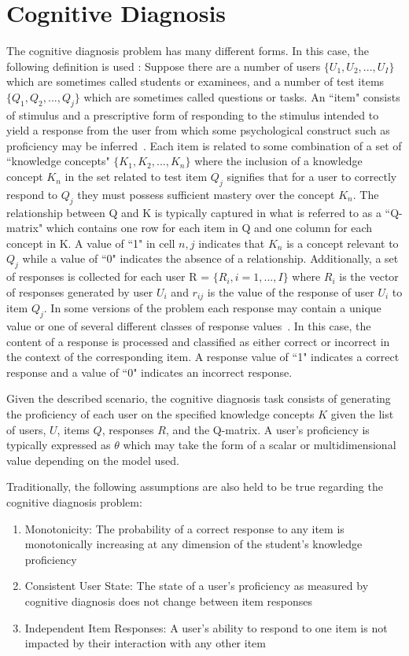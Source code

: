 \documentclass[letterpaper, 12pt, captions=tableabove]{scrreprt}
\begin{document}
	\section{Cognitive Diagnosis}
	\label{sec:cognitiveDiagnosis}
	
		The cognitive diagnosis problem has many different forms. In this case, the following definition is used \cite{wang2024}: Suppose there are a number of users $\{U_1, U_2, ..., U_I\}$ which are sometimes called students or examinees, and a number of test items $\{Q_1, Q_2, ..., Q_j\}$ which are sometimes called questions or tasks. An ``item" consists of stimulus and a prescriptive form of responding to the stimulus intended to yield a response from the user from which some psychological construct such as proficiency may be inferred~\cite{osterlind1990}. Each item is related to some combination of a set of ``knowledge concepts" $\{K_1, K_2, ..., K_n\}$ where the inclusion of a knowledge concept $K_n$ in the set related to test item $Q_j$ signifies that for a user to correctly respond to $Q_j$ they must possess sufficient mastery over the concept $K_n$. The relationship between Q and K is typically captured in what is referred to as a ``Q-matrix" which contains one row for each item in Q and one column for each concept in K. A value of ``1" in cell $n,j$ indicates that $K_n$ is a concept relevant to $Q_j$ while a value of ``0" indicates the absence of a relationship. Additionally, a set of responses is collected for each user R = $\{R_i, i = 1, ..., I\}$ where $R_i$ is the vector of responses generated by user $U_i$ and $r_{ij}$ is the value of the response of user $U_i$ to item $Q_j$. In some versions of the problem each response may contain a unique value or one of several different classes of response values~\cite{wang2021}. In this case, the content of a response is processed and classified as either correct or incorrect in the context of the corresponding item. A response value of ``1" indicates a correct response and a value of ``0" indicates an incorrect response. 

	Given the described scenario, the cognitive diagnosis task consists of generating the proficiency of each user on the specified knowledge concepts $K$ given the list of users, $U$, items $Q$, responses $R$, and the Q-matrix. A user's proficiency is typically expressed as $\theta$ which may take the form of a scalar or multidimensional value depending on the model used.

		Traditionally, the following assumptions are also held to be true regarding the cognitive diagnosis problem: 
		\begin{enumerate}
			\item Monotonicity: The probability of a correct response to any item is monotonically increasing at any dimension of the student's knowledge proficiency \cite{wang2022}
			\item Consistent User State: The state of a user's proficiency as measured by cognitive diagnosis does not change between item responses \cite{reckase2006} 
			\item Independent Item Responses: A user's ability to respond to one item is not impacted by their interaction with any other item\cite{reckase2006} 
		\end{enumerate}
\end{document}
